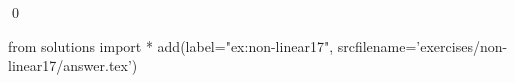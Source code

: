 
\begin{ex} 
  \label{ex:non-linear17}
  
  \qed
\end{ex} 
\begin{python0}
from solutions import *
add(label="ex:non-linear17",
    srcfilename='exercises/non-linear17/answer.tex') 
\end{python0}
